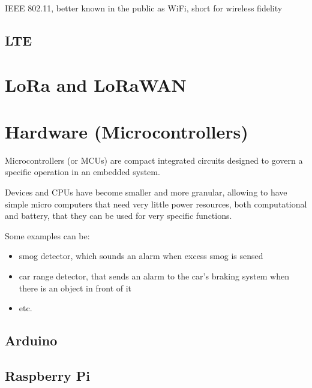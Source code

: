 IEEE 802.11, better known in the public as WiFi, short for wireless fidelity

\subsection{LTE}



\section{LoRa and LoRaWAN}

\section{Hardware (Microcontrollers)}

	Microcontrollers (or MCUs) are compact integrated circuits designed to govern a specific operation in an embedded system.
	
	Devices and CPUs have become smaller and more granular, allowing to have simple micro computers that need very little power resources, both computational and battery, that they can be used for very specific functions.
	
	Some examples can be:
	\begin{itemize}
		\item smog detector, which sounds an alarm when excess smog is sensed
		\item car range detector, that sends an alarm to the car's braking system when there is an object in front of it
		\item etc.
	\end{itemize}

\subsection{Arduino}

	

\subsection{Raspberry Pi}

